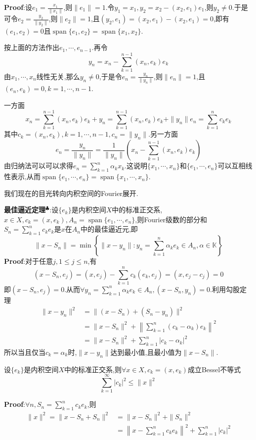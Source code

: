 \textbf{Proof}:设$e_1=\frac{x_1}{\|x_1\|}$,则$\|e_1\|=1$.令$y_1=x_1,y_2=x_2-(x_2,e_1)e_1$,则$y_2\neq 0$.于是可令$e_2=\frac{y_2}{\|y_2\|}$,则$\|e_2\|=1$,且$(y_2,e_1)=(x_2,e_1)-(x_2,e_1)=0$,即有$(e_1,e_2)=0$且$\operatorname{span}\{e_1,e_2\}=\operatorname{span}\{x_1,x_2\}$.\par
按上面的方法作出$e_1,\cdots,e_{n-1}$.再令
$$
y_n=x_n-\sum_{k=1}^{n-1}(x_n,e_k)e_k
$$
由$x_1,\cdots,x_n$线性无关,那么$y_n\neq 0$,于是令$e_n=\frac{y_n}{\|y_n\|}$,则$\|e_n\|=1$,且$(e_n,e_k)=0,k=1,\cdots,n-1$.\par
一方面
$$
x_n=\sum_{k=1}^{n-1}(x_n,e_k)e_k+y_n=\sum_{k=1}^{n-1}(x_n,e_k)e_k+\|y_n\|e_n=\sum_{k=1}^{n}c_ke_k
$$
其中$c_k=(x_n,e_k),k=1,\cdots,n-1,c_n=\|y_n\|$.另一方面
$$
e_n=\frac{y_n}{\|y_n\|}=\frac{1}{\|y_n\|}\left(x_n-\sum_{k=1}^{n-1}(x_n,e_k)e_k\right)
$$
由归纳法可以可以求得$e_n=\sum_{k=1}^{n}\alpha_k x_k$.这说明$\{x_1,\cdots,x_n\}$和$\{e_1,\cdots,e_n\}$可以互相线性表示,从而$\operatorname{span}\{e_1,\cdots,e_n\}=\operatorname{span}\{x_1,\cdots,x_n\}$.\par
我们现在的目光转向内积空间的Fourier展开.\par
\textbf{最佳逼近定理}$^\clubsuit $:设$\{e_k\}$是内积空间$X$中的标准正交系,$x\in X,c_k=(x,e_k),A_n=\operatorname{span}\{e_1,\cdots,e_n\}$,则Fourier级数的部分和$S_n=\sum_{k=1}^{n}c_ke_k$是$x$在$A_n$中的最佳逼近元,即
$$
\|x-S_n\|=\min\left\{\|x-y_n\|:y_n=\sum_{k=1}^{n}\alpha_ke_k\in A_n,\alpha\in \mathbb{K}\right\}
$$
\qquad \textbf{Proof}:对于任意$j,1\leqslant j\leqslant n$,有
$$
(x-S_n,e_j)=(x,e_j)-\sum_{k=1}^{n}c_k(e_k,e_j)=(x,e_j-c_j)=0
$$
即$(x-S_n,e_j)=0$.从而$\forall y_n=\sum_{k=1}^{n}\alpha_ke_k\in A_n,(x-S_n,y_n)=0$.利用勾股定理
$$
\begin{aligned}
\|x-y_n\|^2 &= \|(x-S_n)+(S_n-y_n)\|^2\\
            &= \|x-S_n\|^2+\left\|\sum_{k=1}^{n}(c_k-\alpha_k)e_k\right\|^2\\
            &= \|x-S_n\|^2+\sum_{k=1}^{n}|c_k-\alpha_k|^2
\end{aligned}
$$
所以当且仅当$c_k=\alpha_k$时,$\|x-y_n\|$达到最小值,且最小值为$\|x-S_n\|$.\par
\begin{tcolorbox}[colback=KuangNei,colframe=BianKuang,title=\textbf{Bessel不等式},sharpish corners]
    设$\{e_k\}$是内积空间$X$中的标准正交系,则$\forall x\in X,c_k=(x,e_k)$成立Bessel不等式
    $$
    \sum_{k=1}^{\infty}|c_k|^2\leqslant \|x\|^2
    $$
\end{tcolorbox}
\textbf{Proof}:$\forall n,S_n=\sum_{k=1}^{n}c_ke_k$,则
$$
\begin{aligned}
    \|x\|^2=\|x-S_n+S_n\|^2 &= \|x-S_n\|^2+\|S_n\|^2\\
                            &= \left\|x-\sum_{k=1}^{n}c_ke_k\right\|^2+\sum_{k=1}^{n}|c_k|^2
\end{aligned}
$$
